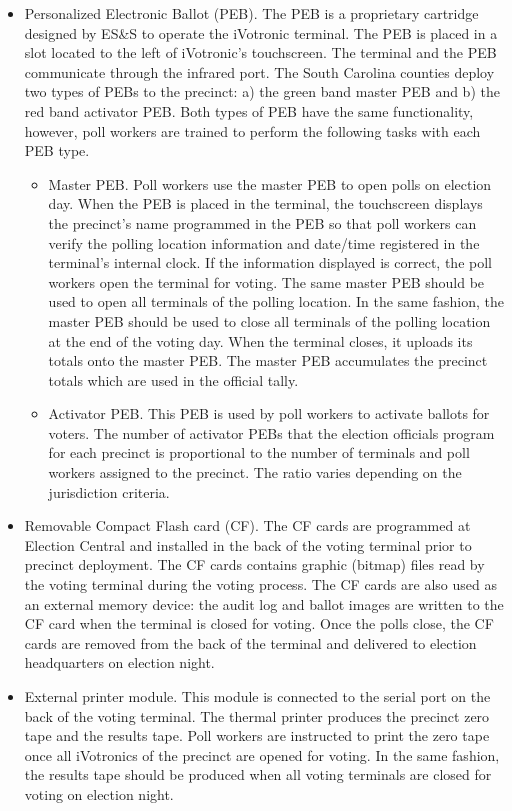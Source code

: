 \begin{itemize}
\item Personalized Electronic Ballot (PEB). The PEB is a proprietary cartridge designed by ES\&S to operate the iVotronic terminal.  The PEB is placed in a slot located to the left of iVotronic\textquoteright s touchscreen. The terminal and the PEB communicate through the infrared port. The South Carolina counties deploy two types of PEBs to the precinct: a) the green band master PEB and b) the red band activator PEB. Both types of PEB have the same functionality, however, poll workers are trained to perform the following tasks with each PEB type.
    \begin{itemize}
    \item Master PEB.  Poll workers use the master PEB to open polls on election day. When the PEB is placed in the terminal, the touchscreen displays the precinct\textquoteright s name programmed in the PEB so that poll workers can verify the polling location information and date/time registered in the terminal\textquoteright s internal clock. If the information displayed is correct, the poll workers open the terminal for voting. The same master PEB should be used to open all terminals of the polling location. In the same fashion, the master PEB should be used to close all terminals of the polling location at the end of the voting day. When the terminal closes, it uploads  its totals onto the master PEB. The master PEB accumulates the precinct totals which are used in the official tally.
    \item Activator PEB.  This PEB is used by  poll workers to activate ballots for voters. The number of activator PEBs that the election officials program for each precinct is proportional to the number of terminals and poll workers assigned to the precinct. The ratio varies depending on the jurisdiction criteria.
    \end{itemize}
\item Removable Compact Flash card (CF). The CF cards are programmed at Election Central and installed in the back of the voting terminal prior to precinct deployment. The CF cards contains graphic (bitmap) files read by the voting terminal during the voting process. The CF cards are also used as an external memory device: the audit log and ballot images are written to the CF card when the terminal is closed for voting. Once the polls close, the CF cards are removed from the back of the terminal and delivered to election headquarters on election night. 

\item External printer module. This module is connected to the serial port on the back of the voting terminal. The thermal printer produces the precinct zero tape and the results tape. Poll workers are instructed to print the zero tape once all iVotronics of the precinct are opened for voting. In the same fashion, the results tape should be produced when all voting terminals are closed for voting on election night.
\end{itemize}

